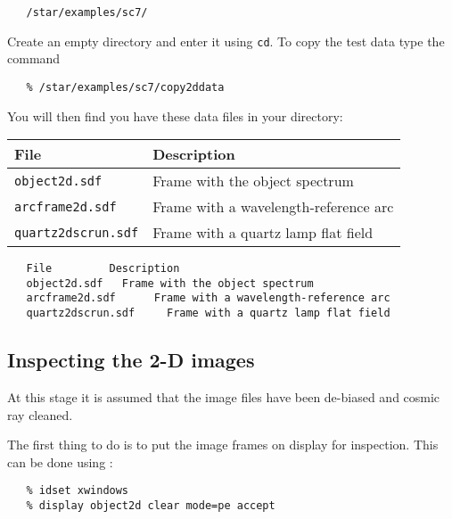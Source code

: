 {
\scspec{\small}{ }
\begin{verbatim}
   /star/examples/sc7/
\end{verbatim}
}

Create an empty directory and enter it using \verb+cd+\@.
To copy the test data type the command

{
\scspec{\small}{ }
\begin{verbatim}
   % /star/examples/sc7/copy2ddata
\end{verbatim}
}

You will then find you have these data files in your directory:

\begin{latexonly}
\begin{center}
\begin{tabular}{ll}
File & Description \\ \hline
{\tt object2d.sdf}  & Frame with the object spectrum\\
{\tt arcframe2d.sdf}     & Frame with a wavelength-reference arc\\
{\tt quartz2dscrun.sdf}    & Frame with a quartz lamp flat field\\
\end{tabular}
\end{center}
\end{latexonly}
\begin{htmlonly}
\begin{verbatim}
   File         Description
   object2d.sdf   Frame with the object spectrum
   arcframe2d.sdf      Frame with a wavelength-reference arc
   quartz2dscrun.sdf     Frame with a quartz lamp flat field
\end{verbatim}
\end{htmlonly}

\subsection{Inspecting the 2-D images}

At this stage it is assumed that the image files have been de-biased and
cosmic ray cleaned.

The first thing to do is to put the image frames on display for inspection.
This can be done using 
:

{
\scspec{\small}{ }
\begin{verbatim}
   % idset xwindows
   % display object2d clear mode=pe accept
\end{verbatim}
}

